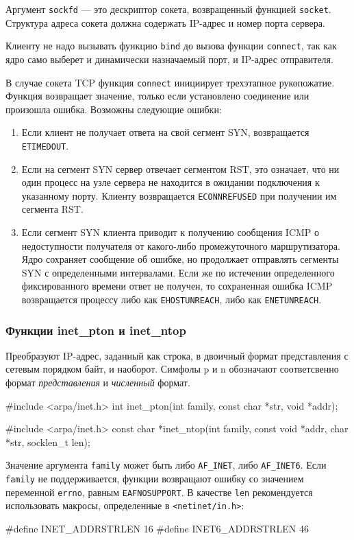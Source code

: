 Аргумент \lstinline{sockfd} --- это дескриптор сокета, возвращенный функцией \lstinline{socket}. Структура адреса сокета должна содержать IP-адрес и номер порта сервера.

Клиенту не надо вызывать функцию \lstinline{bind} до вызова функции \lstinline{connect}, так как ядро само выберет и динамически назначаемый порт, и IP-адрес отправителя.

В случае сокета TCP функция \lstinline{connect} инициирует трехэтапное рукопожатие. Функция возвращает значение, только если установлено соединение или произошла ошибка. Возможны следующие ошибки:
\begin{enumerate}
  \item Если клиент не получает ответа на свой сегмент SYN, возвращается \lstinline{ETIMEDOUT}.
  \item Если на сегмент SYN сервер отвечает сегментом RST, это означает, что ни один процесс на узле сервера не находится в ожидании подключения к указанному порту. Клиенту возвращается \lstinline{ECONNREFUSED} при получении им сегмента RST.
  \item Если сегмент SYN клиента приводит к получению сообщения ICMP о недоступности получателя от какого-либо промежуточного маршрутизатора. Ядро сохраняет сообщение об ошибке, но продолжает отправлять сегменты SYN с определенными интервалами. Если же по истечении определенного фиксированного времени ответ не получен, то сохраненная ошибка ICMP возвращается процессу либо как \lstinline{EHOSTUNREACH}, либо как \lstinline{ENETUNREACH}.
\end{enumerate}

\subsubsection{Функции inet\_pton и inet\_ntop}
Преобразуют IP-адрес, заданный как строка, в двоичный формат представления с сетевым порядком байт, и наоборот. Симфолы p и n обозначают соответсвенно формат \emph{представления} и \emph{численный} формат.
\begin{clst}{}{}
#include <arpa/inet.h>
int inet_pton(int family, const char *str, void *addr);

#include <arpa/inet.h>
const char *inet_ntop(int family, const void *addr, char *str,
                      socklen_t len);
\end{clst}

Значение аргумента \lstinline{family} может быть либо \lstinline{AF_INET}, либо \lstinline{AF_INET6}. Если \lstinline{family} не поддерживается, функции возвращают ошибку со значением переменной \lstinline{errno}, равным \lstinline{EAFNOSUPPORT}. В качестве \lstinline{len} рекомендуется использовать макросы, определенные в \lstinline{<netinet/in.h>}:
\begin{clst}{}{}
#define  INET_ADDRSTRLEN    16
#define  INET6_ADDRSTRLEN   46
\end{clst}


